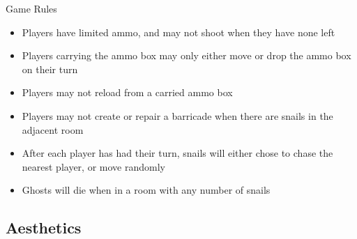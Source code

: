 \documentclass{beamer}
\begin{document}
\begin{frame}{Game Rules}
  \begin{itemize}
    \item Players have limited ammo, and may not shoot when they have none left
    \item Players carrying the ammo box may only either move or drop the ammo box on their turn
    \item Players may not reload from a carried ammo box
    \item Players may not create or repair a barricade when there are snails in the adjacent room
    \item After each player has had their turn, snails will either chose to chase the nearest player, or move randomly
    \item Ghosts will die when in a room with any number of snails
  \end{itemize}
\end{frame}

\subsection{Aesthetics}
\end{document}
